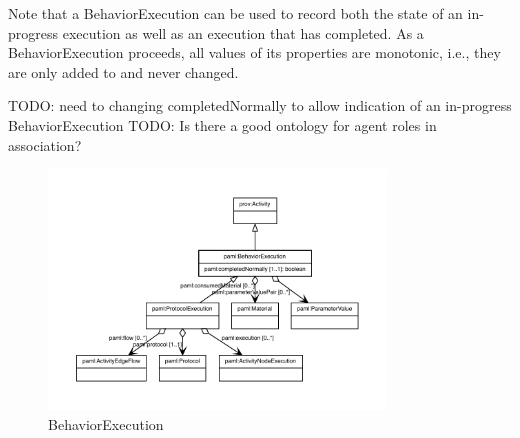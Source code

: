         Note that a BehaviorExecution can be used to record both the state of an in-progress execution as well as an
        execution that has completed. As a BehaviorExecution proceeds, all values of its properties are monotonic,
        i.e., they are only added to and never changed.

        TODO: need to changing completedNormally to allow indication of an in-progress BehaviorExecution
        TODO: Is there a good ontology for agent roles in association?%
\linebreak%
\linebreak%


\begin{figure}[h!]%
\centering%
\includegraphics[width=0.8\textwidth]{paml_classes/BehaviorExecution_abstraction_hierarchy.pdf}%
\caption{BehaviorExecution}%
\label{fig:BehaviorExecution}%
\end{figure}

